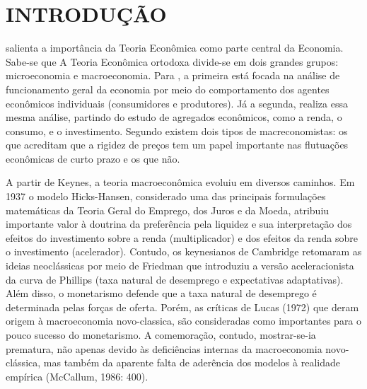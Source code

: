\cleardoublepage

\pagestyle{fancy}


\chapter{INTRODUÇÃO}\label{intro}

\citet{bresser1968macroeconomia} salienta a importância da Teoria Econômica como parte central da Economia. Sabe-se que A Teoria Econômica ortodoxa divide-se em dois grandes grupos: microeconomia e macroeconomia. Para \citet{bresser1968macroeconomia}, a primeira está focada na análise de funcionamento geral da economia por meio do comportamento dos agentes econômicos individuais (consumidores e produtores). Já a segunda, realiza essa mesma análise, partindo do estudo de agregados econômicos, como a renda, o consumo, e o investimento. Segundo \citet{ball1994sticky} existem dois tipos de macreconomistas: os que acreditam que a rigidez de preços tem um papel importante nas flutuações econômicas de curto prazo e os que não.

A partir de Keynes, a teoria macroeconômica evoluiu em diversos caminhos. Em 1937 o modelo Hicks-Hansen, considerado uma das principais formulações matemáticas da Teoria Geral do Emprego, dos Juros e da Moeda, atribuiu importante valor à doutrina da preferência pela liquidez e sua interpretação dos efeitos do investimento sobre a renda (multiplicador) e dos efeitos da renda sobre o investimento (acelerador). Contudo, os keynesianos de Cambridge retomaram as ideias neoclássicas por meio de Friedman que introduziu a versão aceleracionista da curva de Phillips (taxa natural de desemprego e expectativas adaptativas). Além disso, o monetarismo defende que a taxa natural de desemprego é determinada pelas forças de oferta. Porém, as críticas de Lucas (1972) que deram origem à macroeconomia novo-classica, são consideradas como importantes para o pouco sucesso do monetarismo.  A comemoração, contudo, mostrar-se-ia prematura, não apenas devido às deficiências internas da macroeconomia novo-clássica, mas também da aparente falta de aderência dos modelos à realidade empírica (McCallum, 1986: 400).

